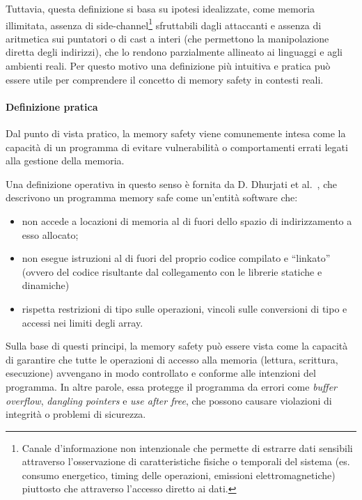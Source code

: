 Tuttavia, questa definizione si basa su ipotesi idealizzate, come memoria illimitata,
assenza di side-channel\footnote{Canale d'informazione non intenzionale che
permette di estrarre dati sensibili attraverso l'osservazione di caratteristiche
fisiche o temporali del sistema (es. consumo energetico, timing delle operazioni,
emissioni elettromagnetiche) piuttosto che attraverso l'accesso diretto ai dati.}
sfruttabili dagli attaccanti e assenza di aritmetica sui puntatori o di cast a interi
(che permettono la manipolazione diretta degli indirizzi), che lo rendono
parzialmente allineato ai linguaggi e agli ambienti reali. Per questo motivo una
definizione più intuitiva e pratica può essere utile per comprendere il concetto
di memory safety in contesti reali.

\paragraph{Definizione pratica}

Dal punto di vista pratico, la memory safety viene comunemente intesa come la
capacità di un programma di evitare vulnerabilità o comportamenti errati legati
alla gestione della memoria.

Una definizione operativa in questo senso è fornita da D. Dhurjati et al.~\cite{memory_safety_without_runtime_checks},
che descrivono un programma memory safe come un'entità software che:
\begin{itemize}
  \item non accede a locazioni di memoria al di fuori dello spazio di indirizzamento
    a esso allocato;

  \item non esegue istruzioni al di fuori del proprio codice compilato e ``linkato''
    (ovvero del codice risultante dal collegamento con le librerie statiche e
    dinamiche)

  \item rispetta restrizioni di tipo sulle operazioni, vincoli sulle conversioni
    di tipo e accessi nei limiti degli array.
\end{itemize}

Sulla base di questi principi, la memory safety può essere vista come la capacità
di garantire che tutte le operazioni di accesso alla memoria (lettura, scrittura,
esecuzione) avvengano in modo controllato e conforme alle intenzioni del programma.
In altre parole, essa protegge il programma da errori come \textit{buffer
overflow}, \textit{dangling pointers} e \textit{use after free}, che possono
causare violazioni di integrità o problemi di sicurezza.

